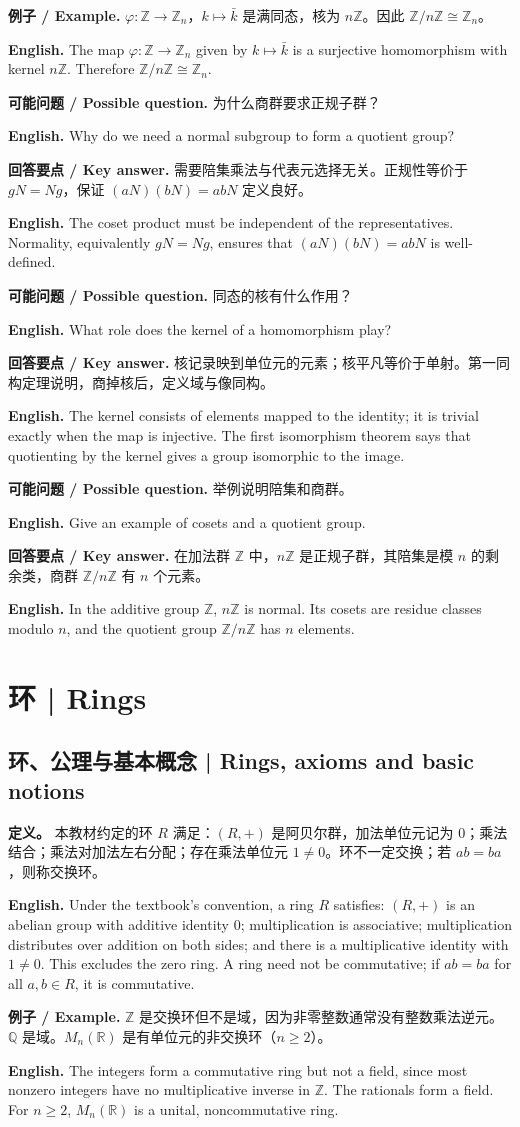 \documentclass[UTF8,11pt,a4paper]{ctexart}
\newcommand{\EN}[1]{\par\noindent\textbf{English.} #1\par}
\newcommand{\EX}[2]{\par\noindent\textbf{例子 / Example.} #1\par\EN{#2}}
\newcommand{\ASK}[4]{\par\noindent\textbf{可能问题 / Possible question.} #1\par\EN{#2}\noindent\textbf{回答要点 / Key answer.} #3\par\EN{#4}\medskip}
\begin{document}
\EX{$\varphi:\mathbb Z\to\mathbb Z_n$，$k\mapsto\bar k$ 是满同态，核为 $n\mathbb Z$。因此 $\mathbb Z/n\mathbb Z\cong\mathbb Z_n$。}{The map $\varphi:\mathbb Z\to\mathbb Z_n$ given by $k\mapsto\bar k$ is a surjective homomorphism with kernel $n\mathbb Z$. Therefore $\mathbb Z/n\mathbb Z\cong\mathbb Z_n$.}

\ASK{为什么商群要求正规子群？}{Why do we need a normal subgroup to form a quotient group?}{需要陪集乘法与代表元选择无关。正规性等价于 $gN=Ng$，保证 $(aN)(bN)=abN$ 定义良好。}{The coset product must be independent of the representatives. Normality, equivalently $gN=Ng$, ensures that $(aN)(bN)=abN$ is well-defined.}

\ASK{同态的核有什么作用？}{What role does the kernel of a homomorphism play?}{核记录映到单位元的元素；核平凡等价于单射。第一同构定理说明，商掉核后，定义域与像同构。}{The kernel consists of elements mapped to the identity; it is trivial exactly when the map is injective. The first isomorphism theorem says that quotienting by the kernel gives a group isomorphic to the image.}

\ASK{举例说明陪集和商群。}{Give an example of cosets and a quotient group.}{在加法群 $\mathbb Z$ 中，$n\mathbb Z$ 是正规子群，其陪集是模 $n$ 的剩余类，商群 $\mathbb Z/n\mathbb Z$ 有 $n$ 个元素。}{In the additive group $\mathbb Z$, $n\mathbb Z$ is normal. Its cosets are residue classes modulo $n$, and the quotient group $\mathbb Z/n\mathbb Z$ has $n$ elements.}

\section{环 | Rings}
\subsection{环、公理与基本概念 | Rings, axioms and basic notions}
\noindent\textbf{定义。} 本教材约定的环 $R$ 满足：$(R,+)$ 是阿贝尔群，加法单位元记为 $0$；乘法结合；乘法对加法左右分配；存在乘法单位元 $1\ne0$。环不一定交换；若 $ab=ba$，则称交换环。

\EN{Under the textbook's convention, a ring $R$ satisfies: $(R,+)$ is an abelian group with additive identity $0$; multiplication is associative; multiplication distributes over addition on both sides; and there is a multiplicative identity with $1\ne0$. This excludes the zero ring. A ring need not be commutative; if $ab=ba$ for all $a,b\in R$, it is commutative.}

\EX{$\mathbb Z$ 是交换环但不是域，因为非零整数通常没有整数乘法逆元。$\mathbb Q$ 是域。$M_n(\mathbb R)$ 是有单位元的非交换环（$n\ge2$）。}{The integers form a commutative ring but not a field, since most nonzero integers have no multiplicative inverse in $\mathbb Z$. The rationals form a field. For $n\ge2$, $M_n(\mathbb R)$ is a unital, noncommutative ring.}
\end{document}

